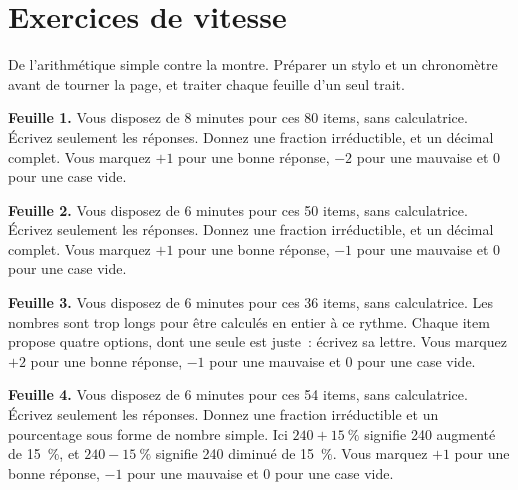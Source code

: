 \chapter{Exercices de vitesse}\label{ch:iv1:speed-drills}

\begin{ivtrains}
De l'arithmétique simple contre la montre. Préparer un stylo et un chronomètre avant de tourner la page, et traiter chaque feuille d'un seul trait.
\end{ivtrains}
\vfill\clearpage

\begin{question}\label{iq:iv1:speed-drills:1}
\textbf{Feuille 1.} Vous disposez de 8 minutes pour ces 80 items, sans calculatrice. Écrivez seulement les réponses. Donnez une fraction irréductible, et un décimal complet. Vous marquez $+1$ pour une bonne réponse, $-2$ pour une mauvaise et 0 pour une case vide.

\end{question}
\clearpage

\begin{question}\label{iq:iv1:speed-drills:2}
\textbf{Feuille 2.} Vous disposez de 6 minutes pour ces 50 items, sans calculatrice. Écrivez seulement les réponses. Donnez une fraction irréductible, et un décimal complet. Vous marquez $+1$ pour une bonne réponse, $-1$ pour une mauvaise et 0 pour une case vide.

\end{question}
\clearpage

\begin{question}\label{iq:iv1:speed-drills:3}
\textbf{Feuille 3.} Vous disposez de 6 minutes pour ces 36 items, sans calculatrice. Les nombres sont trop longs pour être calculés en entier à ce rythme. Chaque item propose quatre options, dont une seule est juste~: écrivez sa lettre. Vous marquez $+2$ pour une bonne réponse, $-1$ pour une mauvaise et 0 pour une case vide.

\end{question}
\clearpage

\begin{question}\label{iq:iv1:speed-drills:4}
\textbf{Feuille 4.} Vous disposez de 6 minutes pour ces 54 items, sans calculatrice. Écrivez seulement les réponses. Donnez une fraction irréductible et un pourcentage sous forme de nombre simple. Ici $240 + 15~\%$ signifie 240 augmenté de 15~\%, et $240 - 15~\%$ signifie 240 diminué de 15~\%. Vous marquez $+1$ pour une bonne réponse, $-1$ pour une mauvaise et 0 pour une case vide.

\end{question}
\clearpage

